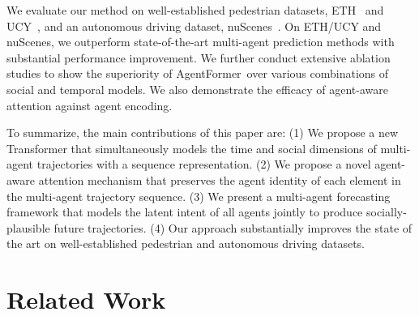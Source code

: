 \documentclass[10pt,twocolumn,letterpaper]{article}
\newcommand{\mname}{AgentFormer}
\begin{document}
We evaluate our method on well-established pedestrian datasets, ETH~\cite{pellegrini2009you} and UCY~\cite{lerner2007crowds}, and an autonomous driving dataset, nuScenes~\cite{caesar2020nuscenes}. On ETH/UCY and nuScenes, we outperform state-of-the-art multi-agent prediction methods with substantial performance improvement. We further conduct extensive ablation studies to show the superiority of \mname\ over various combinations of social and temporal models. We also demonstrate the efficacy of agent-aware attention against agent encoding.

To summarize, the main contributions of this paper are:
(1) We propose a new Transformer that simultaneously models the time and social dimensions of multi-agent trajectories with a sequence representation. (2) We propose a novel agent-aware attention mechanism that preserves the agent identity of each element in the multi-agent trajectory sequence. (3) We present a multi-agent forecasting framework that models the latent intent of all agents jointly to produce socially-plausible future trajectories. (4) Our approach substantially improves the state of the art on well-established pedestrian and autonomous driving datasets.

\section{Related Work}
\end{document}
